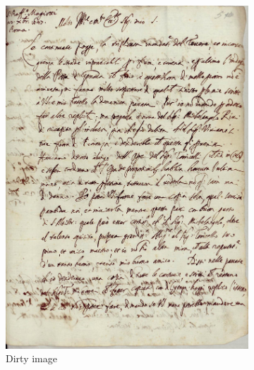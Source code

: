 \documentclass[%
 reprint,
 amsmath,amssymb,
 aps,
]{revtex4-1}
\begin{document}
\begin{figure}%
\centering
\begin{subfigure}{.9\columnwidth}
\includegraphics[width=\columnwidth]{gali2}%
\caption{Dirty image}%
\label{subfiga}%
\end{subfigure}\hfill%
\begin{subfigure}{.9\columnwidth}

\end{subfigure}
\end{figure}
\end{document}
